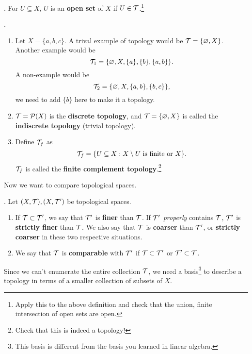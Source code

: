 .  For \(U \subseteq X\), \(U\) is an \textbf{open set} of \(X\) if \(U \in \mathcal{T}\).\footnote{Apply this to the above definition and check that the union, finite intersection of open sets are open.}

\ex.
\begin{enumerate}
    \item Let \(X = \{a, b, c\}\). A trival example of topology would be \(\mathcal{T} = \{\varnothing, X\}\). Another example would be
          \[
              \mathcal{T}_1 = \{\varnothing, X, \{a\}, \{b\}, \{a, b\}\}.
          \]
          A non-example would be
          \[
              \mathcal{T}_2 = \{\varnothing, X, \{a, b\}, \{b, c\}\},
          \]
          we need to add \(\{b\}\) here to make it a topology.
    \item \(\mathcal{T} = \mathcal{P}(X)\) is the \textbf{discrete topology}, and \(\mathcal{T} = \{\varnothing, X\}\) is called the \textbf{indiscrete topology} (trivial topology).
    \item Define \(\mathcal{T}_f\) as
          \[
              \mathcal{T}_f = \{U \subseteq X : X \setminus U \text{ is finite or } X\}.
          \]
          \(\mathcal{T}_f\) is called the \textbf{finite complement topology}.\footnote{Check that this is indeed a topology!}
\end{enumerate}

Now we want to compare topological spaces.

. Let \((X, \mathcal{T}), (X, \mathcal{T'})\) be topological spaces.
\begin{enumerate}
    \item If \(\mathcal{T} \subset \mathcal{T'}\), we say that \(\mathcal{T'}\) is \textbf{finer} than \(\mathcal{T}\). If \(\mathcal{T}'\) \textit{properly} contains \(\mathcal{T}\), \(\mathcal{T'}\) is \textbf{strictly finer} than \(\mathcal{T}\). We also say that \(\mathcal{T}\) is \textbf{coarser} than \(\mathcal{T}'\), or \textbf{strictly coarser} in these two respective situations.
    \item We say that \(\mathcal{T}\) is \textbf{comparable} with \(\mathcal{T'}\) if \(\mathcal{T} \subset \mathcal{T}'\) or \(\mathcal{T}' \subset \mathcal{T}\).
\end{enumerate}

\pagebreak


Since we can't enumerate the entire collection \(\mathcal{T}\), we need a basis\footnote{This basis is different from the basis you learned in linear algebra.} to describe a topology in terms of a smaller collection of subsets of \(X\).

